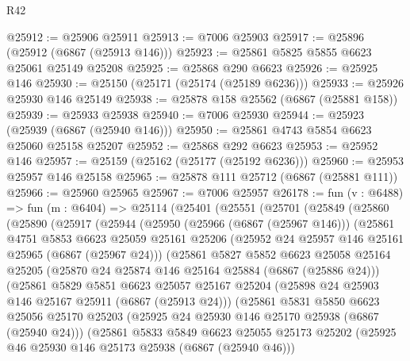 \begin{lexlean}{R42}
\begin{coremodule}
{@25912 := @25906 @25911
@25913 := @7006 @25903
@25917 := @25896 (@25912 (@6867 (@25913 @146)))
@25923 := @25861 @5825 @5855 @6623 @25061 @25149 @25208
@25925 := @25868 @290 @6623
@25926 := @25925 @146
@25930 := @25150 (@25171 (@25174 (@25189 @6236)))
@25933 := @25926 @25930 @146 @25149
@25938 := @25878 @158 @25562 (@6867 (@25881 @158))
@25939 := @25933 @25938
@25940 := @7006 @25930
@25944 := @25923 (@25939 (@6867 (@25940 @146)))
@25950 := @25861 @4743 @5854 @6623 @25060 @25158 @25207
@25952 := @25868 @292 @6623
@25953 := @25952 @146
@25957 := @25159 (@25162 (@25177 (@25192 @6236)))
@25960 := @25953 @25957 @146 @25158
@25965 := @25878 @111 @25712 (@6867 (@25881 @111))
@25966 := @25960 @25965
@25967 := @7006 @25957
@26178 := fun (v : @6488) =>
  fun (m : @6404) =>
  @25114
    (@25401
      (@25551
        (@25701
          (@25849
            (@25860
              (@25890
                (@25917
                  (@25944
                    (@25950
                      (@25966 (@6867 (@25967 @146)))
                      (@25861
                        @4751
                        @5853
                        @6623
                        @25059
                        @25161
                        @25206
                        (@25952 @24 @25957 @146 @25161 @25965 (@6867 (@25967 @24)))
                        (@25861
                          @5827
                          @5852
                          @6623
                          @25058
                          @25164
                          @25205
                          (@25870 @24 @25874 @146 @25164 @25884 (@6867 (@25886 @24)))
                          (@25861
                            @5829
                            @5851
                            @6623
                            @25057
                            @25167
                            @25204
                            (@25898 @24 @25903 @146 @25167 @25911 (@6867 (@25913 @24)))
                            (@25861
                              @5831
                              @5850
                              @6623
                              @25056
                              @25170
                              @25203
                              (@25925 @24 @25930 @146 @25170 @25938 (@6867 (@25940 @24)))
                              (@25861
                                @5833
                                @5849
                                @6623
                                @25055
                                @25173
                                @25202
                                (@25925 @46 @25930 @146 @25173 @25938 (@6867 (@25940 @46)))
}
\end{coremodule}
\end{lexlean}
